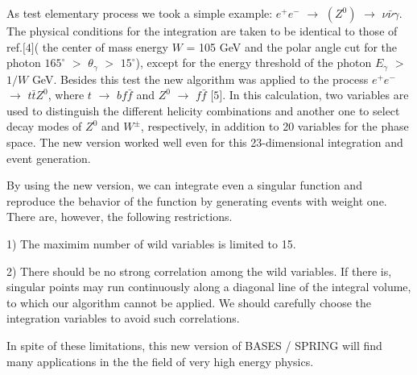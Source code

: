 \vskip 1.0cm
\par\medskip
As test elementary process we took a simple example: $e^+e^-$ $\rightarrow$
$( Z^0 )$ $\rightarrow$ $\nu \bar{\nu} \gamma$.
The physical conditions for the integration are taken to be  identical to
those of ref.$\lbrack 4 \rbrack$( the center of mass energy $W$ = 105
GeV and the polar angle cut for the photon $165^{\circ}$ $>$ $\theta_{\gamma}$
$>$ $15^{\circ}$), except for the energy threshold of the photon $E_{\gamma}$  $>
$ $1/W$  GeV. 
Besides this test the new algorithm was  applied to the
process $e^+e^-$ $\rightarrow$ $t \bar{t} Z^0$, where $t$ $\rightarrow$ 
 $b f \bar{f}$ and $Z^0$ $\rightarrow$ $f \bar{f}$ $\lbrack 5 \rbrack$.
In this calculation, two variables are used to distinguish the
different helicity combinations and another one to select decay modes of $Z^0$
and $W^{\pm}$, respectively, in addition to 20 variables for the phase space.
The new version  worked well even for this 23-dimensional integration and
 event generation.

By using the new version, we can integrate even a singular function and
reproduce the behavior of the function by generating events with weight one.
There are,  however, the following restrictions.
{\small\begin{description}
\item{1)} The maximim number of wild variables is limited to 15.
\item{2)} There should be no strong correlation among the wild variables. 
If there is, singular points may run continuously along a diagonal line of the
integral volume, to which our algorithm cannot be applied.
We should carefully choose the integration variables to  avoid such
correlations. 
\end{description}}
\par\noindent
In spite of these limitations, this new version of {\small BASES / SPRING}
will find many applications in the the field of very high  energy physics.